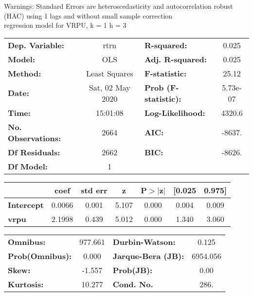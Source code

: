 Warnings: \newline
 [1] Standard Errors are heteroscedasticity and autocorrelation robust (HAC) using 1 lags and without small sample correction\\ 

regression model for VRPU, k = 1 h = 3\begin{center}
\begin{tabular}{lclc}
\toprule
\textbf{Dep. Variable:}    &       rtrn       & \textbf{  R-squared:         } &     0.025   \\
\textbf{Model:}            &       OLS        & \textbf{  Adj. R-squared:    } &     0.025   \\
\textbf{Method:}           &  Least Squares   & \textbf{  F-statistic:       } &     25.12   \\
\textbf{Date:}             & Sat, 02 May 2020 & \textbf{  Prob (F-statistic):} &  5.73e-07   \\
\textbf{Time:}             &     15:01:08     & \textbf{  Log-Likelihood:    } &    4320.6   \\
\textbf{No. Observations:} &        2664      & \textbf{  AIC:               } &    -8637.   \\
\textbf{Df Residuals:}     &        2662      & \textbf{  BIC:               } &    -8626.   \\
\textbf{Df Model:}         &           1      & \textbf{                     } &             \\
\bottomrule
\end{tabular}
\begin{tabular}{lcccccc}
                   & \textbf{coef} & \textbf{std err} & \textbf{z} & \textbf{P$> |$z$|$} & \textbf{[0.025} & \textbf{0.975]}  \\
\midrule
\textbf{Intercept} &       0.0066  &        0.001     &     5.107  &         0.000        &        0.004    &        0.009     \\
\textbf{vrpu}      &       2.1998  &        0.439     &     5.012  &         0.000        &        1.340    &        3.060     \\
\bottomrule
\end{tabular}
\begin{tabular}{lclc}
\textbf{Omnibus:}       & 977.661 & \textbf{  Durbin-Watson:     } &    0.125  \\
\textbf{Prob(Omnibus):} &   0.000 & \textbf{  Jarque-Bera (JB):  } & 6954.056  \\
\textbf{Skew:}          &  -1.557 & \textbf{  Prob(JB):          } &     0.00  \\
\textbf{Kurtosis:}      &  10.277 & \textbf{  Cond. No.          } &     286.  \\
\bottomrule
\end{tabular}
\end{center}

